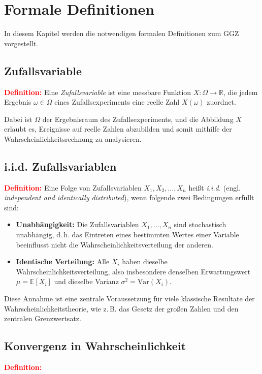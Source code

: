 \documentclass[aodsor,preprint]{imsart}
\numberwithin{equation}{section}
\theoremstyle{plain}
\begin{document}
\section{Formale Definitionen}
\label{sec:definitionen}


In diesem Kapitel werden die notwendigen formalen Definitionen zum GGZ vorgestellt.


\subsection{Zufallsvariable}
\textcolor{red}{
\textbf{Definition:} }
Eine \emph{Zufallsvariable} ist eine messbare Funktion \( X \colon \Omega \to \mathbb{R} \), die jedem Ergebnis \(\omega \in \Omega\) eines Zufallsexperiments eine reelle Zahl \(X(\omega)\) zuordnet.

Dabei ist \(\Omega\) der Ergebnisraum des Zufallsexperiments, und die Abbildung \(X\) erlaubt es, Ereignisse auf reelle Zahlen abzubilden und somit mithilfe der Wahrscheinlichkeitsrechnung zu analysieren.


\subsection{i.i.d. Zufallsvariablen}
\textcolor{red}{
\textbf{Definition:} }
Eine Folge von Zufallsvariablen \( X_1, X_2, \dots, X_n \) heißt \emph{i.i.d.} (engl. \emph{independent and identically distributed}), wenn folgende zwei Bedingungen erfüllt sind:

\begin{itemize}
  \item \textbf{Unabhängigkeit:} Die Zufallsvariablen \( X_1, \dots, X_n \) sind stochastisch unabhängig, d.\,h. das Eintreten eines bestimmten Wertes einer Variable beeinflusst nicht die Wahrscheinlichkeitsverteilung der anderen.
  \item \textbf{Identische Verteilung:} Alle \( X_i \) haben dieselbe Wahrscheinlichkeitsverteilung, also insbesondere denselben Erwartungswert \( \mu = \mathbb{E}[X_i] \) und dieselbe Varianz \( \sigma^2 = \text{Var}(X_i) \).
\end{itemize}

Diese Annahme ist eine zentrale Voraussetzung für viele klassische Resultate der Wahrscheinlichkeitstheorie, wie z.\,B. das Gesetz der großen Zahlen und den zentralen Grenzwertsatz.


\subsection{Konvergenz in Wahrscheinlichkeit}
\textcolor{red}{
\textbf{Definition:} }
\end{document}
